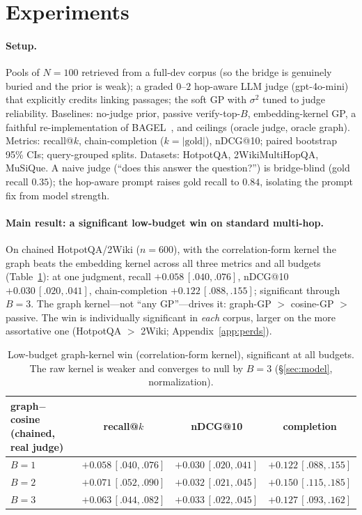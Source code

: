 \documentclass[11pt]{article}
\theoremstyle{plain}\newtheorem{theorem}{Theorem}\newtheorem{lemma}{Lemma}\newtheorem{proposition}{Proposition}
\theoremstyle{definition}\newtheorem{assumption}{Assumption}\newtheorem{remark}{Remark}
\begin{document}
\section{Experiments}\label{sec:exp}
\paragraph{Setup.} Pools of $N=100$ retrieved from a full-dev corpus (so the bridge is genuinely buried and the
prior is weak); a graded $0$--$2$ hop-aware LLM judge (gpt-4o-mini) that explicitly credits linking passages; the
soft GP with $\sigma^2$ tuned to judge reliability. Baselines: no-judge prior, passive verify-top-$B$,
embedding-kernel GP, a faithful re-implementation of BAGEL~\citep{bagel2026}, and ceilings (oracle judge, oracle
graph). Metrics: recall@$k$, chain-completion
($k=|\text{gold}|$), nDCG@10; paired bootstrap 95\% CIs; query-grouped splits. Datasets: HotpotQA,
2WikiMultiHopQA, MuSiQue. A naive judge (``does this answer the question?'') is bridge-blind (gold recall $0.35$);
the hop-aware prompt raises gold recall to $0.84$, isolating the prompt fix from model strength.

\paragraph{Main result: a significant low-budget win on standard multi-hop.} On chained HotpotQA/2Wiki
($n{=}600$), with the correlation-form kernel the graph beats the embedding kernel across all three metrics and all
budgets (Table~\ref{tab:main}): at one judgment, recall $+0.058\,[.040,.076]$, nDCG@10 $+0.030\,[.020,.041]$,
chain-completion $+0.122\,[.088,.155]$; significant through $B{=}3$. The graph kernel---not ``any GP''---drives it:
graph-GP $>$ cosine-GP $>$ passive. The win is individually significant in \emph{each} corpus, larger on the more
assortative one (HotpotQA $>$ 2Wiki; Appendix~\ref{app:perds}).
\begin{table}[t]\centering\small
\begin{tabular}{lccc}
\toprule
graph$-$cosine (chained, real judge) & recall@$k$ & nDCG@10 & completion \\ \midrule
$B=1$ & $+0.058\,[.040,.076]$ & $+0.030\,[.020,.041]$ & $+0.122\,[.088,.155]$ \\
$B=2$ & $+0.071\,[.052,.090]$ & $+0.032\,[.021,.045]$ & $+0.150\,[.115,.185]$ \\
$B=3$ & $+0.063\,[.044,.082]$ & $+0.033\,[.022,.045]$ & $+0.127\,[.093,.162]$ \\
\bottomrule
\end{tabular}
\caption{Low-budget graph-kernel win (correlation-form kernel), significant at all budgets. The raw kernel is
weaker and converges to null by $B=3$ (\S\ref{sec:model}, normalization).}\label{tab:main}
\end{table}
\end{document}
